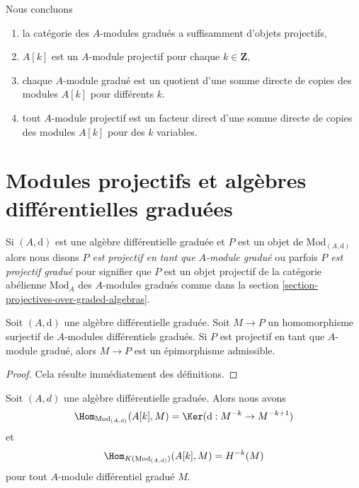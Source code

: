 \medskip\noindent
Nous concluons
\begin{enumerate}
\item la catégorie des $A$-modules gradués a suffisamment d'objets projectifs,
\item $A[k]$ est un $A$-module projectif pour chaque $k \in \mathbf{Z}$,
\item chaque $A$-module gradué est un quotient d'une somme directe
de copies des modules $A[k]$ pour différents $k$.
\item tout $A$-module projectif est un facteur direct d'une somme
directe de copies des modules $A[k]$ pour des $k$ variables.
\end{enumerate}




\section{Modules projectifs et algèbres différentielles graduées}
\label{section-projective-over-differential-graded}

\noindent
Si $(A, \text{d})$ est une algèbre différentielle graduée et $P$ est
un objet de $\text{Mod}_{(A, \text{d})}$ alors nous disons
{\it $P$ est projectif en tant que $A$-module gradué} ou parfois
{\it $P$ est projectif gradué} pour signifier que $P$
est un objet projectif de la catégorie abélienne $\text{Mod}_A$ des
$A$-modules gradués comme dans
la section \ref{section-projectives-over-graded-algebras}.

\begin{lemma}
\label{lemma-target-graded-projective}
Soit $(A, \text{d})$ une algèbre différentielle graduée.
Soit $M \to P$ un homomorphisme surjectif de $A$-modules différentiels
gradués. Si $P$ est projectif en tant que $A$-module gradué, alors
$M \to P$ est un épimorphisme admissible.
\end{lemma}

\begin{proof}
Cela résulte immédiatement des définitions.
\end{proof}

\begin{lemma}
\label{lemma-hom-from-shift-free}
Soit $(A, d)$ une algèbre différentielle graduée. Alors nous avons
$$
\Hom_{\text{Mod}_{(A, \text{d})}}(A[k], M) =
\Ker(\text{d} : M^{-k} \to M^{-k + 1})
$$
et
$$
\Hom_{K(\text{Mod}_{(A, \text{d})})}(A[k], M) = H^{-k}(M)
$$
pour tout $A$-module différentiel gradué $M$.
\end{lemma}

